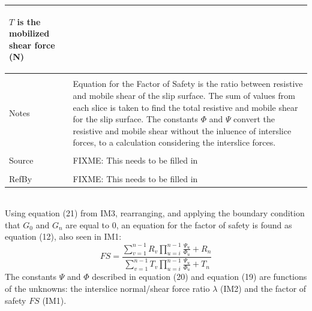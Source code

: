 \documentclass[12pt]{article}
\begin{document}
\begin{minipage}{\textwidth}
\begin{tabular}{p{} p{}}
\begin{symbDescription}
              \item{$T$ is the mobilized shear force (N)}
              \end{symbDescription}
\\ \midrule \\
Notes & Equation for the Factor of Safety is the ratio between resistive and mobile shear of the slip surface. The sum of values from each slice is taken to find the total resistive and mobile shear for the slip surface. The constants $Φ$ and $Ψ$ convert the resistive and mobile shear without the inluence of interslice forces, to a calculation considering the interslice forces.
\\ \midrule \\
Source & FIXME: This needs to be filled in
\\ \midrule \\
RefBy & FIXME: This needs to be filled in
\\ \bottomrule \end{tabular}
\end{minipage}\\
Using equation (21) from IM3, rearranging, and applying the boundary condition that $G_{0}$ and $G_{n}$ are equal to $0$, an equation for the factor of safety is found as equation (12), also seen in IM1:
\begin{dmath}
FS=\frac{\displaystyle\sum_{v=1}^{n-1}{R_{v} \displaystyle\prod_{u=i}^{n-1}{\frac{Ψ_{u}}{Φ_{u}}}}+R_{n}}{\displaystyle\sum_{v=1}^{n-1}{T_{v} \displaystyle\prod_{u=i}^{n-1}{\frac{Ψ_{u}}{Φ_{u}}}}+T_{n}}
\end{dmath}
The constants $Ψ$ and $Φ$ described in equation (20) and equation (19) are functions of the unknowns: the interslice normal/shear force ratio $λ$ (IM2) and the factor of safety $FS$ (IM1).
~\newline
\end{document}
